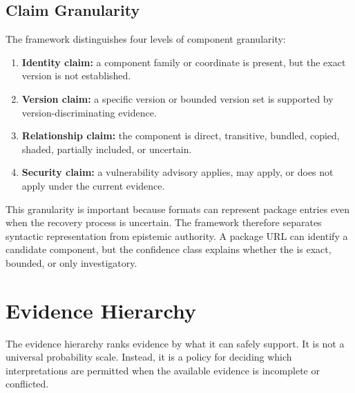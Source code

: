 \subsection{Claim Granularity}

The framework distinguishes four levels of component granularity:

\begin{enumerate}
  \item \textbf{Identity claim:} a component family or coordinate is present,
  but the exact version is not established.
  \item \textbf{Version claim:} a specific version or bounded version set is
  supported by version-discriminating evidence.
  \item \textbf{Relationship claim:} the component is direct, transitive,
  bundled, copied, shaded, partially included, or uncertain.
  \item \textbf{Security claim:} a vulnerability advisory applies, may apply,
  or does not apply under the current evidence.
\end{enumerate}

This granularity is important because \SBOM formats can represent package
entries even when the recovery process is uncertain. The framework therefore
separates syntactic representation from epistemic authority. A package URL can
identify a candidate component, but the confidence class explains whether the
\PURL is exact, bounded, or only investigatory.

\section{Evidence Hierarchy}

The evidence hierarchy ranks evidence by what it can safely support. It is not
a universal probability scale. Instead, it is a policy for deciding which
interpretations are permitted when the available evidence is incomplete or
conflicted.

